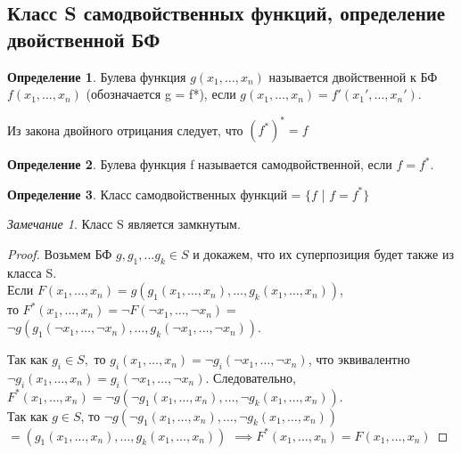 \documentclass[a4paper]{article}
\theoremstyle{definition}
\newtheorem*{definition}{Определение}
\theoremstyle{remark}
\newtheorem*{remark}{Замечание}
\begin{document}
    \subsection{Класс S самодвойственных функций, определение двойственной БФ}
    \begin{definition}
        Булева функция $g(x_1, \dots, x_n)$ называется двойственной к БФ $f(x_1, \dots, x_n)$
        (обозначается g = f*), если $g(x_1, \dots, x_n) = f'(x_1', \dots, x_n')$.
    \end{definition}
    Из закона двойного отрицания следует, что $(f^*)^* = f$
    \begin{definition}
        Булева функция f называется самодвойственной, если $f = f^*$.
    \end{definition}
    \begin{definition}
        Класс самодвойственных функций = $\{f$ | $f = f^*\}$
    \end{definition}
    \begin{remark}
        Класс S является замкнутым.
    \end{remark}
    \begin{proof}
        Возьмем БФ $g, g_1, \dots g_k \in S$ и докажем, что их
        суперпозиция будет также из класса S. \\
        Если $F(x_1, \dots, x_n) = g(g_1(x_1, \dots, x_n), \dots, g_k(x_1, \dots, x_n))$,\\
        то $F^*(x_1, \dots, x_n) = \neg F(\neg x_1, \dots, \neg x_n) = $
        $\neg g(g_1(\neg x_1, \dots, \neg x_n), \dots, g_k(\neg x_1, \dots, \neg x_n))$.

        Так как $g_i \in S,$ то $g_i(x_1, \dots, x_n) = \neg g_i(\neg x_1, \dots, \neg x_n)$,
        что эквивалентно $ \neg g_i(x_1, \dots, x_n) = g_i(\neg x_1, \dots, \neg x_n)$.
        Следовательно, $F^*(x_1, \dots, x_n) = \neg g(\neg g_1(x_1, \dots, x_n), \dots, \neg g_k (x_1, \dots, x_n))$.\\
        Так как $g\in S$, то $\neg g(\neg g_1(x_1, \dots, x_n), \dots, \neg g_k (x_1, \dots, x_n))$
        $= (g_1(x_1, \dots, x_n), \dots, g_k(x_1, \dots, x_n))$
        $\implies F^*(x_1, \dots, x_n) = F(x_1, \dots, x_n)$
    \end{proof}
\end{document}
